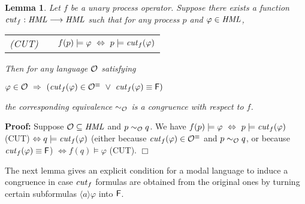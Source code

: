 \documentclass{eptcs}
\def\hmo{{\cal O}}
\def\hml{{\it HML}}
\def\hmeq{\sim_{\cal O}}
\def\iff{\Leftrightarrow}
\def\implies{\Rightarrow}
\def\false{{\sf F}}
\newtheorem{lemm}{Lemma}
\newenvironment{lemma}{\begin{lemm} \rm }{\end{lemm}}
\newenvironment{proof}{\begin{trivlist} \item[\hspace{\labelsep}\bf Proof:]}{\hfill $\Box$ \end{trivlist}}
\newcommand{\diam}[1]{\langle#1\rangle}
\begin{document}
\begin{lemma}
\label{lem:cut1} Let $f$ be a unary process operator. Suppose there exists a function  ${\it cut}_f: \hml \longrightarrow \hml$ such that for any process $p$ and $\varphi\in\hml$,
\begin{center}
\begin{tabular}{l l}
(CUT)~~ & $f(p) \models \varphi~\iff~p \models {\it cut}_f(\varphi)$\\
\end{tabular}
\end{center}
Then for any language $\hmo$ satisfying
\begin{center}
$\varphi \in \hmo~\implies~({\it cut}_f(\varphi) \in \hmo^\equiv~\lor~{\it cut}_f(\varphi)\equiv \false)$
\end{center}
the corresponding equivalence $\hmeq$ is a congruence with respect to $f$.
\end{lemma}
\begin{proof} Suppose $\hmo \subseteq \hml$ and $p \hmeq q$. We have
$f(p) \models \varphi ~\iff~ p \models {\it cut}_f(\varphi)$ (CUT) $\iff q \models {\it cut}_f(\varphi)$ (either because ${\it cut}_f(\varphi) \in \hmo^\equiv$ and $p \hmeq q$, or because ${\it cut}_f(\varphi)\equiv \false$) $\iff f(q) \models \varphi$ (CUT).
\end{proof}
The next lemma gives an explicit condition for a modal language to induce a congruence in case ${\it cut}_f$ formulas are obtained from the original ones by turning certain subformulas $\diam{a} \varphi$ into $\false$.
\end{document}

